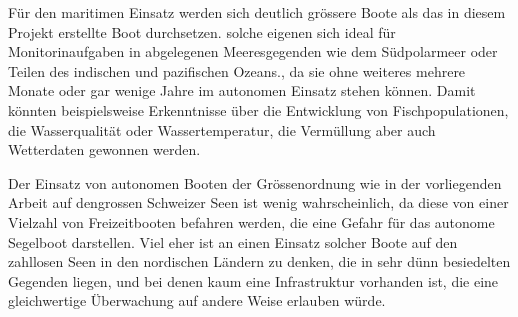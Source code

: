 Für den maritimen Einsatz werden sich deutlich grössere Boote als das in diesem Projekt erstellte Boot durchsetzen. solche eigenen sich ideal für Monitorinaufgaben in abgelegenen Meeresgegenden wie dem Südpolarmeer oder Teilen des indischen und pazifischen Ozeans., da sie ohne weiteres mehrere Monate oder gar wenige Jahre im autonomen Einsatz stehen können. Damit könnten beispielsweise Erkenntnisse über die Entwicklung von Fischpopulationen, die Wasserqualität oder Wassertemperatur, die Vermüllung aber auch Wetterdaten gewonnen werden. 

Der Einsatz von autonomen Booten der Grössenordnung wie in der  vorliegenden Arbeit auf dengrossen Schweizer Seen ist wenig wahrscheinlich, da diese von einer Vielzahl von Freizeitbooten befahren werden, die eine Gefahr für das autonome Segelboot darstellen. Viel eher ist an einen Einsatz solcher Boote auf den zahllosen Seen in den nordischen Ländern zu denken, die in sehr dünn besiedelten Gegenden liegen, und bei denen kaum eine Infrastruktur vorhanden ist, die eine gleichwertige Überwachung auf andere Weise erlauben würde.